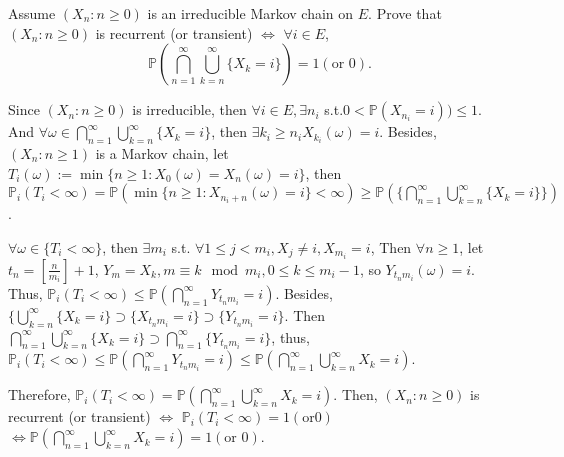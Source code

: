 \documentclass{ctexart}
\newif\ifpreface
\begin{document}
\large
\setlength{\baselineskip}{1.2em}
\ifpreface
  
\else
\fi
{}
\begin{problem}\label{pro:1}
  Assume \((X_n:n \geq 0)\) is an irreducible Markov chain on \(E\).
  Prove that \((X_n:n \geq 0)\) is recurrent (or transient) \(\iff\)
  \(\forall i \in E\),
  \[
    \mathbb{P}\left(\bigcap_{n=1}^{\infty} \bigcup_{k=n}^{\infty} \{X_k=i\}\right)=1 (\text{or } 0).
  \]
\end{problem}
\begin{solution}
  Since \((X_n: n \geq 0)\) is irreducible, then
  \(\forall i \in E, \exists n_i\) s.t.\(0< \mathbb{P}(X_{n_i}=i))\leq 1\).
  And \(\forall \omega \in \bigcap_{n=1}^{\infty} \bigcup_{k=n}^{\infty} \{X_k =i\}\), then \(\exists k_i \geq n_i X_{k_i}(\omega)=i\).
  Besides, \((X_n:n \geq 1)\) is a Markov chain,
  let \(T_i(\omega):=\min\{n \geq 1: X_0(\omega)=X_n(\omega)=i\}\),
  then \(\mathbb{P}_i(T_i<\infty)=\mathbb{P}(\min\{n \geq 1: X_{n_i + n}(\omega)=i\}< \infty) \geq \mathbb{P}(\{\bigcap_{n=1}^{\infty} \bigcup_{k=n}^{\infty} \{X_k=i\} \})\).

  \(\forall \omega \in \{T_i < \infty\}\), then \(\exists m_i\) s.t. \(\forall 1 \leq j < m_i, X_j \neq i, X_{m_i}=i\),
  Then \(\forall n \geq 1\), let \(t_n=[\frac{n}{m_i}]+ 1\), \(Y_m=X_k, m \equiv k \mod m_i, 0 \leq k \leq m_i-1\), so
  \(Y_{t_nm_i}(\omega)=i\).
  Thus, \(\mathbb{P}_i(T_i < \infty) \leq \mathbb{P}(\bigcap_{n=1}^{\infty} Y_{t_nm_i}=i)\).
  Besides, \(\{\bigcup_{k=n}^{\infty} \{X_k=i\} \supset\{X_{t_nm_i}=i\}\supset\{Y_{t_nm_i}=i\}\).
  Then \(\bigcap_{n=1}^{\infty} \bigcup_{k=n}^{\infty} \{X_k=i\} \supset \bigcap_{n=1}^{\infty} \{Y_{t_nm_i}=i\}\),
  thus, \(\mathbb{P}_i(T_i < \infty) \leq \mathbb{P}(\bigcap_{n=1}^{\infty} Y_{t_nm_i}=i) \leq \mathbb{P}(\bigcap_{n=1}^{\infty} \bigcup_{k=n}^{\infty} X_k=i)\).

  Therefore, \(\mathbb{P}_i(T_i < \infty) = \mathbb{P}(\bigcap_{n=1}^{\infty} \bigcup_{k=n}^{\infty} X_k=i)\). Then, \((X_n: n \geq 0)\) is recurrent (or transient)
  \(\iff \) \(\mathbb{P}_i(T_i < \infty)=1 (\text{or} 0)\) \(\iff \mathbb{P}(\bigcap_{n=1}^{\infty} \bigcup_{k=n}^{\infty} X_k=i)=1 (\text{or 0})\).
\end{solution}
\end{document}
